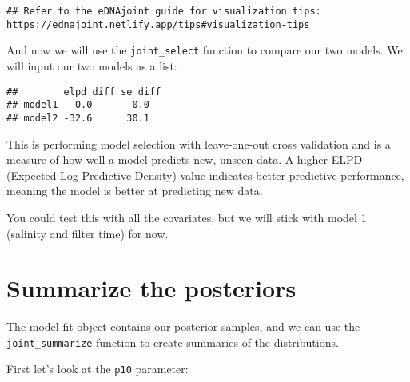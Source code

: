 \documentclass[
]{article}
\newenvironment{Shaded}{\begin{snugshade}}{\end{snugshade}}
\newcommand{\AttributeTok}[1]{\textcolor[rgb]{0.13,0.29,0.53}{#1}}
\newcommand{\CommentTok}[1]{\textcolor[rgb]{0.56,0.35,0.01}{\textit{#1}}}
\newcommand{\FunctionTok}[1]{\textcolor[rgb]{0.13,0.29,0.53}{\textbf{#1}}}
\newcommand{\NormalTok}[1]{#1}
\newcommand{\SpecialCharTok}[1]{\textcolor[rgb]{0.81,0.36,0.00}{\textbf{#1}}}
\newcommand{\StringTok}[1]{\textcolor[rgb]{0.31,0.60,0.02}{#1}}
\begin{document}
\begin{verbatim}
## Refer to the eDNAjoint guide for visualization tips:  https://ednajoint.netlify.app/tips#visualization-tips
\end{verbatim}

And now we will use the \texttt{joint\_select} function to compare our
two models. We will input our two models as a list:

\begin{Shaded}
\end{Shaded}

\begin{verbatim}
##        elpd_diff se_diff
## model1   0.0       0.0  
## model2 -32.6      30.1
\end{verbatim}

This is performing model selection with leave-one-out cross validation
and is a measure of how well a model predicts new, unseen data. A higher
ELPD (Expected Log Predictive Density) value indicates better predictive
performance, meaning the model is better at predicting new data.

You could test this with all the covariates, but we will stick with
model 1 (salinity and filter time) for now.

\section{Summarize the posteriors}\label{summarize-the-posteriors}

The model fit object contains our posterior samples, and we can use the
\texttt{joint\_summarize} function to create summaries of the
distributions.

First let's look at the \texttt{p10} parameter:

\begin{Shaded}
\end{Shaded}
\end{document}
